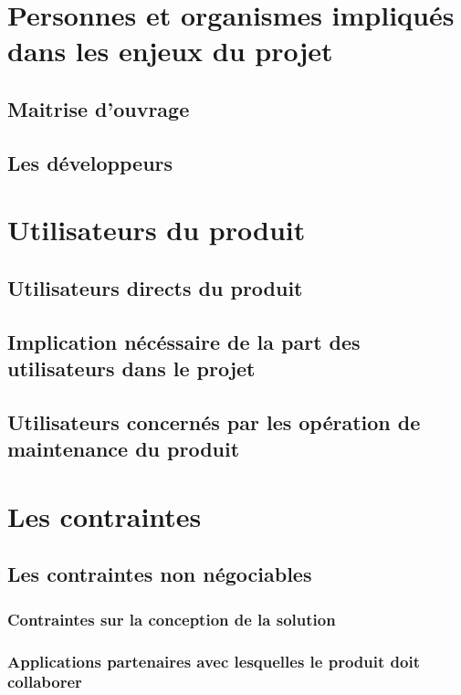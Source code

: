 \documentclass[12pt]{article}
\begin{document}
\newpage
\section{Personnes et organismes impliqués dans les enjeux du projet}

\subsection{Maitrise d'ouvrage}

\subsection{Les développeurs}


\newpage
\section{Utilisateurs du produit}
\subsection{Utilisateurs directs du produit}

\subsection{Implication nécéssaire de la part des utilisateurs dans le projet}

\subsection{Utilisateurs concernés par les opération de maintenance du produit}


\newpage
\section{Les contraintes}

\subsection{Les contraintes non négociables}

\subsubsection{Contraintes sur la conception de la solution}

\subsubsection{Applications partenaires avec lesquelles le produit doit collaborer}
\end{document}
